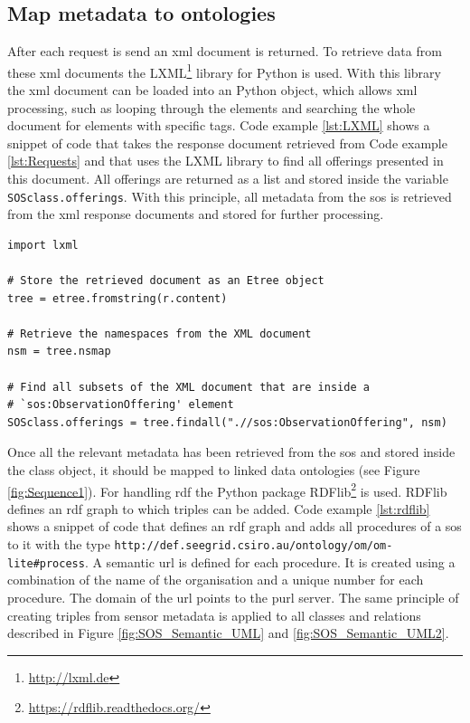 \subsection{Map metadata to ontologies}
\label{maptoont}
After each request is send an \ac{xml} document is returned. To retrieve data from these \ac{xml} documents the LXML\footnote{\url{http://lxml.de}} library for Python is used. With this library the \ac{xml} document can be loaded into an Python object, which allows \ac{xml} processing, such as looping through the elements and searching the whole document for elements with specific tags. Code example \ref{lst:LXML} shows a snippet of code that takes the response document retrieved from Code example \ref{lst:Requests} and that uses the LXML library to find all offerings presented in this document. All offerings are returned as a list and stored inside the variable \texttt{SOSclass.offerings}. With this principle, all metadata from the \ac{sos} is retrieved from the \ac{xml} response documents and stored for further processing.    

\begin{lstlisting}[float,caption={Creating an Etree object from an XML response document using Python's LXML library}, label={lst:LXML}]
import lxml

# Store the retrieved document as an Etree object
tree = etree.fromstring(r.content)

# Retrieve the namespaces from the XML document
nsm = tree.nsmap

# Find all subsets of the XML document that are inside a   
# `sos:ObservationOffering' element 
SOSclass.offerings = tree.findall(".//sos:ObservationOffering", nsm)

\end{lstlisting}   
\begin{sloppypar}
Once all the relevant metadata has been retrieved from the \ac{sos} and stored inside the class object, it should be mapped to linked data ontologies (see Figure \ref{fig:Sequence1}). For handling \ac{rdf} the Python package RDFlib\footnote{\url{https://rdflib.readthedocs.org/}} is used.  RDFlib defines an \ac{rdf} graph to which triples can be added. Code example \ref{lst:rdflib} shows a snippet of code that defines an \ac{rdf} graph and adds all procedures of a \ac{sos} to it with the type \texttt{http://def.seegrid.csiro.au/ontology/om/om-lite\#process}. A semantic \ac{url} is defined for each procedure. It is created using a combination of the name of the organisation and a unique number for each procedure. The domain of the \ac{url} points to the \ac{purl} server. The same principle of creating triples from sensor metadata is applied to all classes and relations described in Figure \ref{fig:SOS_Semantic_UML} and \ref{fig:SOS_Semantic_UML2}. 
\end{sloppypar}


